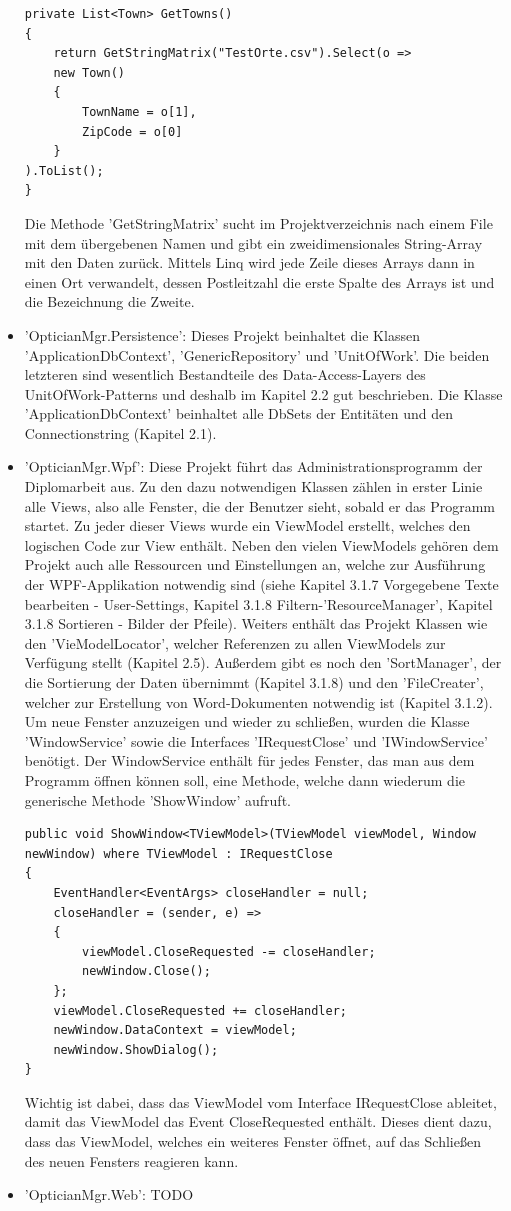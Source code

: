 \begin{itemize}
\begin{lstlisting} 
private List<Town> GetTowns()
{
	return GetStringMatrix("TestOrte.csv").Select(o =>
	new Town()
	{
		TownName = o[1],
		ZipCode = o[0]
	}
).ToList();
}\end{lstlisting} Die Methode 'GetStringMatrix' sucht im Projektverzeichnis nach einem File mit dem übergebenen Namen und gibt ein zweidimensionales String-Array mit den Daten zurück. Mittels Linq wird jede Zeile dieses Arrays dann in einen Ort verwandelt, dessen Postleitzahl die erste Spalte des Arrays ist und die Bezeichnung die Zweite.
\item 'OpticianMgr.Persistence': Dieses Projekt beinhaltet die Klassen 'ApplicationDbContext', 'GenericRepository' und 'UnitOfWork'. Die beiden letzteren sind wesentlich Bestandteile des Data-Access-Layers des UnitOfWork-Patterns und deshalb im Kapitel 2.2 gut beschrieben. Die Klasse 'ApplicationDbContext' beinhaltet alle DbSets der Entitäten und den Connectionstring (Kapitel 2.1).
\item 'OpticianMgr.Wpf': Diese Projekt führt das Administrationsprogramm der Diplomarbeit aus. Zu den dazu notwendigen Klassen zählen in erster Linie alle Views, also alle Fenster, die der Benutzer sieht, sobald er das Programm startet. Zu jeder dieser Views wurde ein ViewModel erstellt, welches den logischen Code zur View enthält. Neben den vielen ViewModels gehören dem Projekt auch alle Ressourcen und Einstellungen an, welche zur Ausführung der WPF-Applikation notwendig sind (siehe Kapitel 3.1.7 Vorgegebene Texte bearbeiten - User-Settings, Kapitel 3.1.8 Filtern-'ResourceManager', Kapitel 3.1.8 Sortieren - Bilder der Pfeile). \newline Weiters enthält das Projekt Klassen wie den 'VieModelLocator', welcher Referenzen zu allen ViewModels zur Verfügung stellt (Kapitel 2.5).  Außerdem gibt es noch den 'SortManager', der die Sortierung der Daten übernimmt (Kapitel 3.1.8) und den 'FileCreater', welcher zur Erstellung von Word-Dokumenten notwendig ist (Kapitel 3.1.2). \newline Um neue Fenster anzuzeigen und wieder zu schließen, wurden die Klasse 'WindowService' sowie die Interfaces 'IRequestClose' und 'IWindowService' benötigt. Der WindowService enthält für jedes Fenster, das man aus dem Programm öffnen können soll, eine Methode, welche dann wiederum die generische Methode 'ShowWindow' aufruft.
\begin{lstlisting}
public void ShowWindow<TViewModel>(TViewModel viewModel, Window newWindow) where TViewModel : IRequestClose
{
	EventHandler<EventArgs> closeHandler = null;
	closeHandler = (sender, e) =>
	{
		viewModel.CloseRequested -= closeHandler;
		newWindow.Close();
	};
	viewModel.CloseRequested += closeHandler;
	newWindow.DataContext = viewModel;
	newWindow.ShowDialog();
}
\end{lstlisting}
Wichtig ist dabei, dass das ViewModel vom Interface IRequestClose ableitet, damit das ViewModel das Event CloseRequested enthält. Dieses dient dazu, dass das ViewModel, welches ein weiteres Fenster öffnet, auf das Schließen des neuen Fensters reagieren kann. 
\item 'OpticianMgr.Web': TODO
\end{itemize} 